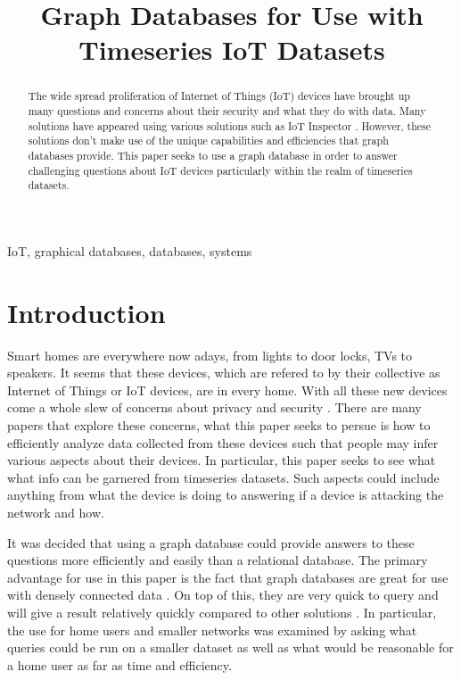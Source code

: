 \documentclass[conference]{IEEEtran}
\begin{document}
\title{Graph Databases for Use with Timeseries IoT Datasets}

\author{
}

\maketitle

\begin{abstract}
The wide spread proliferation of Internet of Things (IoT) devices
have brought up many questions and concerns about their security
and what they do with data. Many solutions have appeared using 
various solutions such as IoT Inspector \cite{IoTInspector}. 
However, these solutions don't make use of the unique capabilities
and efficiencies that graph databases provide. This paper seeks
to use a graph database in order to answer challenging questions 
about IoT devices particularly within the realm of timeseries datasets.
\end{abstract}

\begin{IEEEkeywords}
IoT, graphical databases, databases, systems
\end{IEEEkeywords}

\section{Introduction}
Smart homes are everywhere now adays, from lights to door locks, TVs to speakers.
It seems that these devices, which are refered to by their collective as Internet of Things or IoT devices, are in every home.
With all these new devices come a whole slew of concerns about privacy and security \cite{IoTInspector}.
There are many papers that explore these concerns, what this paper seeks to persue is how to efficiently analyze
data collected from these devices such that people may infer various aspects about their devices. In particular,
this paper seeks to see what what info can be garnered from timeseries datasets. Such aspects could include
anything from what the device is doing to answering if a device is attacking the network and how.

It was decided that using a graph database could provide answers to these questions
more efficiently and easily than a relational database. The primary advantage for use in this paper
is the fact that graph databases are great for use with densely connected data \cite{GraphSurvey}.
On top of this, they are very quick to query and will give a result relatively quickly compared to
other solutions \cite{GraphSurvey}. In particular, the use for home users and smaller networks was 
examined by asking what queries could be run on a smaller dataset as well as what would be reasonable
for a home user as far as time and efficiency.
\end{document}
